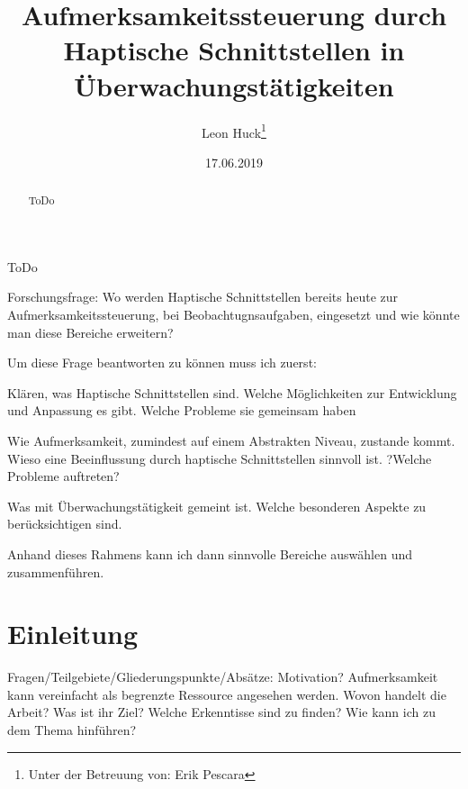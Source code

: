 \documentclass{llncs}					%
\title{Aufmerksamkeitssteuerung durch Haptische Schnittstellen in Überwachungstätigkeiten}
\author{Leon Huck\thanks{Unter der Betreuung von: Erik Pescara}}
\institute{Karlsruher Institut für Technologie}
\date{17.06.2019}
\begin{document}
	
\maketitle

\begin{description}
	\item ToDo
\end{description}

\begin{abstract}
	ToDo
\end{abstract}

\begin{flushleft}
	Forschungsfrage:
	Wo werden Haptische Schnittstellen bereits heute zur Aufmerksamkeitssteuerung, bei Beobachtugnsaufgaben, eingesetzt und wie könnte man diese Bereiche erweitern?
	
	Um diese Frage beantworten zu können muss ich zuerst:
	\item Klären, was Haptische Schnittstellen sind. Welche Möglichkeiten zur  Entwicklung und Anpassung es gibt. Welche Probleme sie gemeinsam haben
	\item Wie Aufmerksamkeit, zumindest auf einem Abstrakten Niveau, zustande kommt. Wieso eine Beeinflussung durch haptische Schnittstellen sinnvoll ist. ?Welche Probleme auftreten?
	\item Was mit Überwachungstätigkeit gemeint ist. Welche besonderen Aspekte zu berücksichtigen sind.
	\item Anhand dieses Rahmens kann ich dann sinnvolle Bereiche auswählen und zusammenführen.
\end{flushleft}
\newpage
\tableofcontents
\newpage

\newpage
\section{Einleitung}
Fragen/Teilgebiete/Gliederungspunkte/Absätze:
Motivation?
Aufmerksamkeit kann vereinfacht als begrenzte Ressource angesehen werden.
Wovon handelt die Arbeit?
Was ist ihr Ziel?
Welche Erkenntisse sind zu finden?
Wie kann ich zu dem Thema hinführen?

\end{document}
